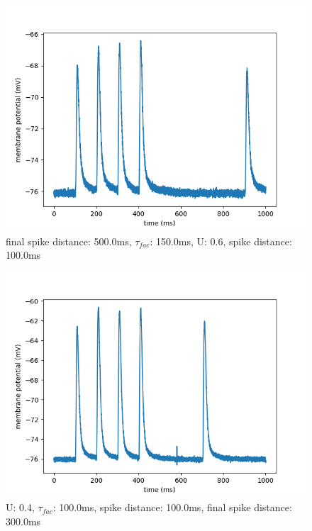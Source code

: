 \documentclass[10pt,a4paper]{scrartcl}
\begin{document}
\newpage

\begin{figure} [ht]
\begin{center}
\label{fig:abb27}
\caption{final spike distance: 500.0ms, $\tau_{fac}$: 150.0ms, U: 0.6, spike distance: 100.0ms}
\includegraphics[scale=0.35]{pictures/final_spike_variation_16.pdf} 
\end{center}
\end{figure}

\begin{figure} [ht]
\begin{center}
\label{fig:abb28}
\caption{U: 0.4, $\tau_{fac}$: 100.0ms, spike distance: 100.0ms, final spike distance: 300.0ms}
\includegraphics[scale=0.35]{pictures/final_spike_variation_17.pdf} 
\end{center}
\end{figure}
\end{document}
